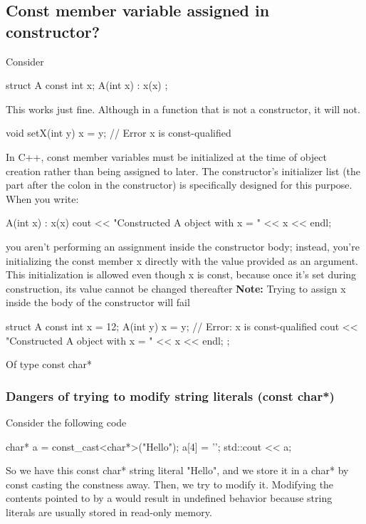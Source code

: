 \documentclass{report}
\begin{document}
\pagebreak 
{}
\bigbreak \noindent 
\subsection{Const member variable assigned in constructor?}
\bigbreak \noindent 
Consider
\bigbreak \noindent 
\begin{cppcode}
    struct A{
        const int x;
        A(int x) : x(x) {}
    };
\end{cppcode}
\bigbreak \noindent 
This works just fine. Although in a function that is not a constructor, it will not.
\bigbreak \noindent 
\begin{cppcode}
    void setX(int y) {
        x = y; // Error x is const-qualified
    }
\end{cppcode}
\bigbreak \noindent 
In C++, const member variables must be initialized at the time of object creation rather than being assigned to later. The constructor’s initializer list (the part after the colon in the constructor) is specifically designed for this purpose. When you write:
\bigbreak \noindent 
\begin{cppcode}
A(int x) : x(x) { 
    cout << "Constructed A object with x = " << x << endl; 
}
\end{cppcode}
\bigbreak \noindent 
you aren’t performing an assignment inside the constructor body; instead, you’re initializing the const member x directly with the value provided as an argument. This initialization is allowed even though x is const, because once it’s set during construction, its value cannot be changed thereafter
\bigbreak \noindent 
\textbf{Note:} Trying to assign x inside the body of the constructor will fail
\bigbreak \noindent 
\begin{cppcode}
    struct A {
        const int x = 12;
        A(int y) { 
            x = y; // Error: x is const-qualified
            cout << "Constructed A object with x = " << x << endl; 
        } 
    };
\end{cppcode}

\pagebreak 
{}
\bigbreak \noindent 
Of type const char*

\pagebreak 
{}
\bigbreak \noindent 
\subsubsection{Dangers of trying to modify string literals (const char*)}
\bigbreak \noindent 
Consider the following code
\bigbreak \noindent 
\begin{cppcode}
    char* a = const_cast<char*>("Hello");
    a[4] = '\0';
    std::cout << a;
\end{cppcode}
\bigbreak \noindent 
So we have this const char* string literal "Hello", and we store it in a char* by const casting the constness away. Then, we try to modify it. 
\bigbreak \noindent 
Modifying the contents pointed to by a would result in undefined behavior because string literals are usually stored in read-only memory.
\end{document}
